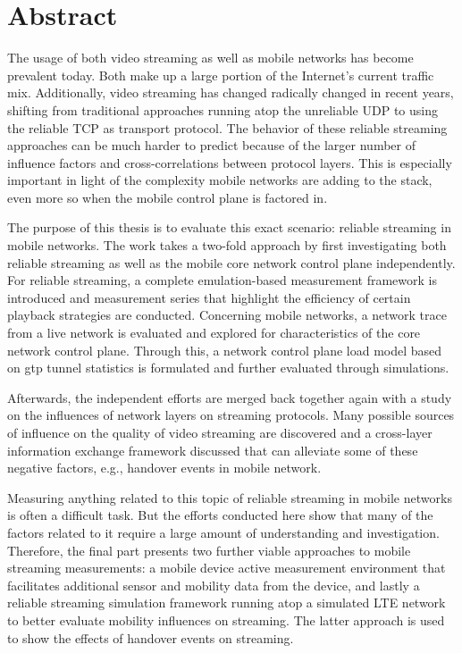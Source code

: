 \chapter*{Abstract}
%

The usage of both video streaming as well as mobile networks has become prevalent today. Both make up a large portion of the Internet's current traffic mix. Additionally, video streaming has changed radically changed in recent years, shifting from traditional approaches running atop the unreliable \acrshort{UDP} to using the reliable \acrshort{TCP} as transport protocol. The behavior of these reliable streaming approaches can be much harder to predict because of the larger number of influence factors and cross-correlations between protocol layers. This is especially important in light of the complexity mobile networks are adding to the stack, even more so when the mobile control plane is factored in.

The purpose of this thesis is to evaluate this exact scenario: reliable streaming in mobile networks. The work takes a two-fold approach by first investigating both reliable streaming as well as the mobile core network control plane independently. For reliable streaming, a complete emulation-based measurement framework is introduced and measurement series that highlight the efficiency of certain playback strategies are conducted. Concerning mobile networks, a network trace from a live network is evaluated and explored for characteristics of the core network control plane. Through this, a network control plane load model based on \acrshort{gtp} tunnel statistics is formulated and further evaluated through simulations.

Afterwards, the independent efforts are merged back together again with a study on the influences of network layers on streaming protocols. Many possible sources of influence on the quality of video streaming are discovered and a cross-layer information exchange framework discussed that can alleviate some of these negative factors, e.g., handover events in mobile network. 

Measuring anything related to this topic of reliable streaming in mobile networks is often a difficult task. But the efforts conducted here show that many of the factors related to it require a large amount of understanding and investigation. Therefore, the final part presents two further viable approaches to mobile streaming measurements: a mobile device active measurement environment that facilitates additional sensor and mobility data from the device, and lastly a reliable streaming simulation framework running atop a simulated \acrshort{LTE} network to better evaluate mobility influences on streaming. The latter approach is used to show the effects of handover events on streaming. 

